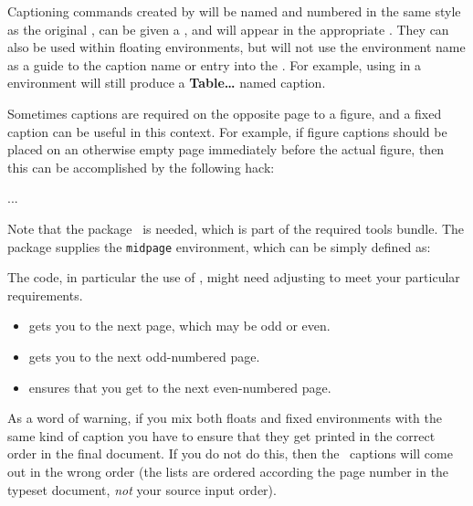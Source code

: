  Captioning commands created by \cmd{\newfixedcaption} will be named and
 numbered in the same style as the original , can
 be given a \cmd{\label}, and will appear in the appropriate 
 \listofx. They can also be used within floating
 environments, but will not use the environment name as a guide to
 the caption name or entry into the \listofx. For
 example, using  in a  environment will still
 produce a \textbf{Table\ldots} named caption.

   Sometimes captions are required on the 
opposite page to a 
figure, and a fixed caption can be useful in this context. 
For example, if figure captions should be placed on an 
otherwise empty page immediately before the actual figure, 
then this can be accomplished by the following hack:
\begin{lcode}
 ...
 \end{lcode}
 Note that the  package~\cite{AFTERPAGE} is needed, 
which is part of the required tools bundle. 
The  package supplies the \verb?midpage?
environment, which can be simply defined as:
\begin{lcode}
\newenvironment{midpage}{\vspace*{\fill}}{\vspace*{\fill}}
\end{lcode}
The code, in particular the use of \cmd{\clearpage}, might need 
adjusting to meet your particular requirements.
\begin{itemize}
\item \cmd{\clearpage} gets you to the next page, which may be odd or even.
\item \cmd{\cleardoublepage} gets you to the next odd-numbered page.
\item \cmd{\cleartoevenpage} ensures that you get to the next
even-numbered page.
\end{itemize}

    As a word of warning, if you mix both floats and fixed environments 
with the same kind of caption you have to ensure that they get printed 
in the correct order in the final document. If you do not do this, then 
the \listofx\ captions will come out in the wrong order (the lists are 
ordered according the
page number in the typeset document, \emph{not} your source input order).



